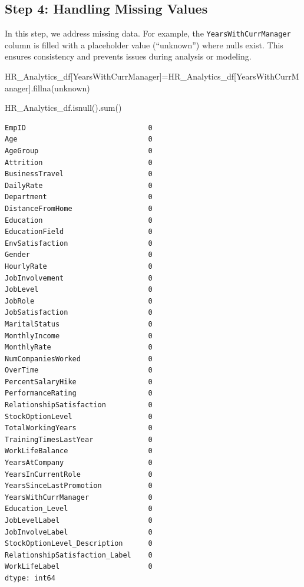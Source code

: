 \documentclass[
  letterpaper,
  DIV=11,
  numbers=noendperiod]{scrartcl}
\newenvironment{Shaded}{\begin{snugshade}}{\end{snugshade}}
\newcommand{\BuiltInTok}[1]{\textcolor[rgb]{0.00,0.23,0.31}{#1}}
\newcommand{\NormalTok}[1]{\textcolor[rgb]{0.00,0.23,0.31}{#1}}
\newcommand{\OperatorTok}[1]{\textcolor[rgb]{0.37,0.37,0.37}{#1}}
\newcommand{\StringTok}[1]{\textcolor[rgb]{0.13,0.47,0.30}{#1}}
\begin{document}
\subsection{Step 4: Handling Missing
Values}\label{step-4-handling-missing-values}

In this step, we address missing data. For example, the
\texttt{YearsWithCurrManager} column is filled with a placeholder value
(``unknown'') where nulls exist. This ensures consistency and prevents
issues during analysis or modeling.

\begin{Shaded}
\begin{Highlighting}[]
\NormalTok{HR\_Analytics\_df[}\StringTok{\textquotesingle{}YearsWithCurrManager\textquotesingle{}}\NormalTok{]}\OperatorTok{=}\NormalTok{HR\_Analytics\_df[}\StringTok{\textquotesingle{}YearsWithCurrManager\textquotesingle{}}\NormalTok{].fillna(}\StringTok{\textquotesingle{}unknown\textquotesingle{}}\NormalTok{)}
\end{Highlighting}
\end{Shaded}

\begin{Shaded}
\begin{Highlighting}[]
\NormalTok{HR\_Analytics\_df.isnull().}\BuiltInTok{sum}\NormalTok{()}
\end{Highlighting}
\end{Shaded}

\begin{verbatim}
EmpID                             0
Age                               0
AgeGroup                          0
Attrition                         0
BusinessTravel                    0
DailyRate                         0
Department                        0
DistanceFromHome                  0
Education                         0
EducationField                    0
EnvSatisfaction                   0
Gender                            0
HourlyRate                        0
JobInvolvement                    0
JobLevel                          0
JobRole                           0
JobSatisfaction                   0
MaritalStatus                     0
MonthlyIncome                     0
MonthlyRate                       0
NumCompaniesWorked                0
OverTime                          0
PercentSalaryHike                 0
PerformanceRating                 0
RelationshipSatisfaction          0
StockOptionLevel                  0
TotalWorkingYears                 0
TrainingTimesLastYear             0
WorkLifeBalance                   0
YearsAtCompany                    0
YearsInCurrentRole                0
YearsSinceLastPromotion           0
YearsWithCurrManager              0
Education_Level                   0
JobLevelLabel                     0
JobInvolveLabel                   0
StockOptionLevel_Description      0
RelationshipSatisfaction_Label    0
WorkLifeLabel                     0
dtype: int64
\end{verbatim}
\end{document}
